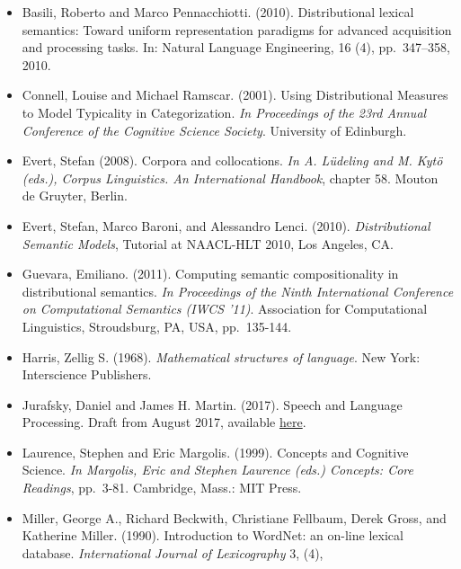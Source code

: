 \documentclass[11pt]{article}
\providecommand{\tightlist}{%
      \setlength{\itemsep}{0pt}\setlength{\parskip}{0pt}}
\begin{document}
\begin{itemize}
\tightlist
\item
  Basili, Roberto and Marco Pennacchiotti. (2010). Distributional
  lexical semantics: Toward uniform representation paradigms for
  advanced acquisition and processing tasks. In: Natural Language
  Engineering, 16 (4), pp.~347--358, 2010.\\
\item
  Connell, Louise and Michael Ramscar. (2001). Using Distributional
  Measures to Model Typicality in Categorization. \emph{In Proceedings
  of the 23rd Annual Conference of the Cognitive Science Society}.
  University of Edinburgh.\\
\item
  Evert, Stefan (2008). Corpora and collocations. \emph{In A. Lüdeling
  and M. Kytö (eds.), Corpus Linguistics. An International Handbook},
  chapter 58. Mouton de Gruyter, Berlin.\\
\item
  Evert, Stefan, Marco Baroni, and Alessandro Lenci. (2010).
  \emph{Distributional Semantic Models}, Tutorial at NAACL-HLT 2010, Los
  Angeles, CA.\\
\item
  Guevara, Emiliano. (2011). Computing semantic compositionality in
  distributional semantics. \emph{In Proceedings of the Ninth
  International Conference on Computational Semantics (IWCS '11)}.
  Association for Computational Linguistics, Stroudsburg, PA, USA,
  pp.~135-144.\\
\item
  Harris, Zellig S. (1968). \emph{Mathematical structures of language}.
  New York: Interscience Publishers.\\
\item
  Jurafsky, Daniel and James H. Martin. (2017). Speech and Language
  Processing. Draft from August 2017, available
  \href{https://web.stanford.edu/~jurafsky/slp3/15.pdf}{here}.\\
\item
  Laurence, Stephen and Eric Margolis. (1999). Concepts and Cognitive
  Science. \emph{In Margolis, Eric and Stephen Laurence (eds.) Concepts:
  Core Readings}, pp.~3-81. Cambridge, Mass.: MIT Press.\\
\item
  Miller, George A., Richard Beckwith, Christiane Fellbaum, Derek Gross,
  and Katherine Miller. (1990). Introduction to WordNet: an on-line
  lexical database. \emph{International Journal of Lexicography} 3, (4),

\end{itemize}
\end{document}
